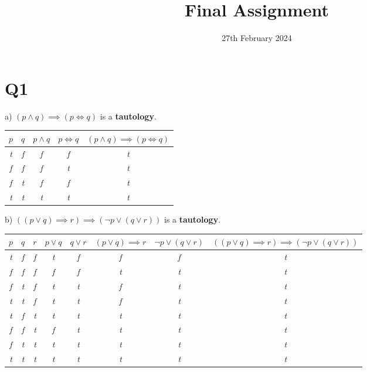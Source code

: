 \documentclass{article}
\title{\vspace{-2.0cm}Final Assignment}
\date{\vspace{-1.0cm}27th February 2024}
\begin{document}
\vspace{-1cm}
\maketitle

\section*{Q1}

a) $(p \land q) \implies (p \iff q)$ is a \textbf{tautology}.

\begin{table}[h!]
\begin{tabular}{|c c c c c|} 
\hline 
$p$ & $q$ & $p \land q$ & $p \iff q$ & $(p \land q) \implies (p \iff q)$ \\
\hline
\em{t} & \em{f} & \em{f} & \em{f} & \em{t}  \\ 
\em{f} & \em{f} & \em{f} & \em{t} & \em{t}  \\
\em{f} & \em{t} & \em{f} & \em{f} & \em{t}  \\
\em{t} & \em{t} & \em{t} & \em{t} & \em{t}  \\
\hline
\end{tabular}
\end{table}

\hspace{-0.6cm} b) $((p \lor q) \implies r) \implies ( \lnot p \lor ( q \lor r ))$ is a \textbf{tautology}.

\begin{table}[h!]
\begin{tabular}{|c c c c c c c c|} 
\hline 
$p$ & $q$ & $r$ & $p \lor q$ & $q \lor r$ & $(p \lor q) \implies r$ & $\lnot p \lor (q \lor r)$ & $((p \lor q) \implies r) \implies (\lnot p \lor (q \lor r))$ \\
\hline
\em{t} & \em{f} & \em{f} & \em{t} & \em{f} & \em{f} & \em{f} & \em{t}  \\ 
\em{f} & \em{f} & \em{f} & \em{f} & \em{f} & \em{t} & \em{t} & \em{t}  \\
\em{f} & \em{t} & \em{f} & \em{t} & \em{t} & \em{f} & \em{t} & \em{t}  \\
\em{t} & \em{t} & \em{f} & \em{t} & \em{t} & \em{f} & \em{t} & \em{t}  \\
\em{t} & \em{f} & \em{t} & \em{t} & \em{t} & \em{t} & \em{t} & \em{t}  \\ 
\em{f} & \em{f} & \em{t} & \em{f} & \em{t} & \em{t} & \em{t} & \em{t}  \\
\em{f} & \em{t} & \em{t} & \em{t} & \em{t} & \em{t} & \em{t} & \em{t}  \\
\em{t} & \em{t} & \em{t} & \em{t} & \em{t} & \em{t} & \em{t} & \em{t}  \\
\hline
\end{tabular}
\end{table}
\end{document}
